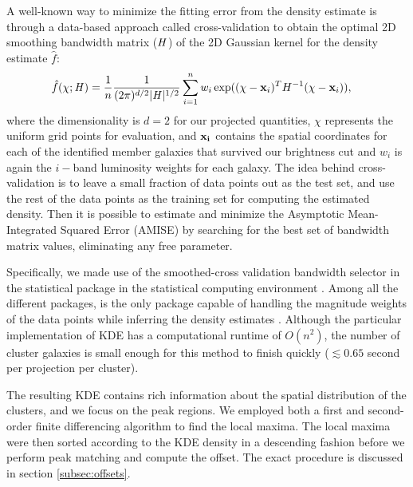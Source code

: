 A well-known way to minimize the fitting error from the density estimate is through
a data-based approach called cross-validation to obtain 
the optimal 2D smoothing
bandwidth matrix ($\mathbf{\it H}$) of the 2D Gaussian kernel for the
density estimate $\hat{f}$:
\begin{align}
	\hat{f}(\chi; \mathbf{\it H}) &= \frac{1}{n} \frac{1}{(2\pi)^{d/2}|\mathbf{\it H}|^{1/2}}
	\sum_{i=1}^n w_i \exp((\chi-{\bf x}_i)^T H^{-1} (\chi-{\bf x}_i)),
	\label{eq:cross_validated_bandwidth}
\end{align}
where the dimensionality is $d=2$ for our projected quantities,
$\chi$ represents the uniform grid points for evaluation, and 
$\bf{x}_i$ contains the spatial coordinates for each of the identified member 
galaxies that survived our brightness cut and $w_i$ is again the $i-$band
luminosity weights for each galaxy.
The idea behind cross-validation is to leave a small fraction of data points 
out as the test set, and use the rest of the data points as 
the training set for computing the estimated density.
Then it is possible to estimate and minimize the Asymptotic Mean-Integrated Squared Error
(AMISE)  by searching
for the best set of bandwidth matrix values, eliminating any free parameter. 

Specifically, we made use of the smoothed-cross validation \citep{Hall1992} 
bandwidth selector in the statistical package {} \citep{Duong2007} 
in the {} statistical computing environment \citep{R_core}. 
Among all the different {} packages, {} is the
only package capable of handling the magnitude weights of the data points 
while inferring the density estimates \citep{Deng2011}. 
Although the particular implementation of KDE has a computational runtime of $O(n^2)$, 
the number of cluster galaxies is
small enough for this method to finish quickly ($\lesssim 0.65$ second per
projection per cluster). 

The resulting KDE contains rich information about the spatial distribution of
the clusters, and we focus on the peak regions.  
We employed both a first and second-order  
finite differencing algorithm to find the local maxima.  
The local maxima were then sorted according to the KDE density in a descending
fashion before we perform peak matching and compute the offset. The exact
procedure is discussed in section \ref{subsec:offsets}. 

